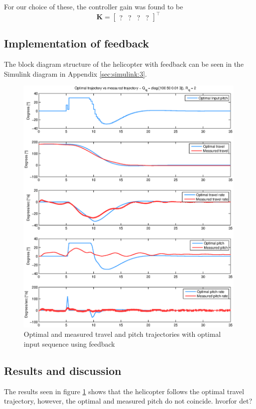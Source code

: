 \documentclass[11pt,a4paper,USenglish]{article} %
\begin{document}
 For our choice of these, the controller gain was found to be
\begin{equation}
\mathbf{K} = \begin{bmatrix} ? & ? & ? & ?\end{bmatrix}^\top
\end{equation}

\subsection{Implementation of feedback}
The block diagram structure of the helicopter with feedback can be seen in the Simulink diagram in Appendix \ref{sec:simulink:3}.

\begin{figure}[!h]
    \begin{minipage}{\textwidth}
 \centerline{\includegraphics[width=1.3\textwidth]{optreg_10_3_2}}
	\caption{Optimal and measured travel and pitch trajectories with optimal input sequence using feedback}
    \end{minipage}
	\label{fig:10_3_2}
\end{figure}

\subsection{Results and discussion}
The results seen in figure \ref{fig:10_3_2} shows that the helicopter follows the optimal travel trajectory, however, the optimal and measured pitch do not coincide. hvorfor det?
\end{document}
